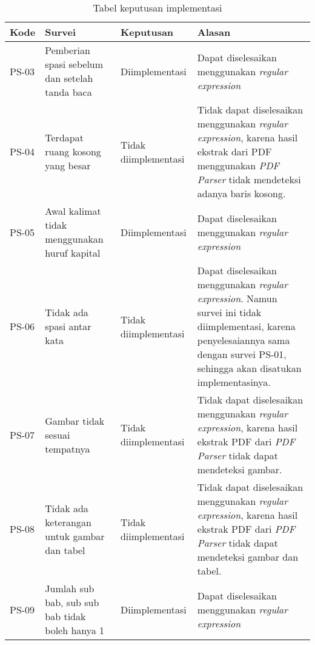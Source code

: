 \begin{table}[H]
	\renewcommand{\arraystretch}{1.5}
	\caption {Tabel keputusan implementasi} \label{tab:keputusan2}
	\begin{center}
		\begin{tabular}{|p{1.5 cm}|>{\raggedright} p{4 cm}| p{2.5 cm}| p{6.5 cm}|}
		\hline
		Kode & Survei & Keputusan & Alasan \\ 
		\hline 
		PS-03 & Pemberian spasi sebelum dan setelah tanda baca & Diimplementasi & Dapat diselesaikan menggunakan \textit{regular expression} \newline \\ 
		\hline 
		PS-04 & Terdapat ruang kosong yang besar & Tidak \newline diimplementasi & Tidak dapat diselesaikan menggunakan \textit{regular expression}, karena hasil ekstrak dari PDF menggunakan \textit{PDF Parser} tidak mendeteksi adanya baris kosong. \newline \\ 		
		\hline 
		PS-05 & Awal kalimat tidak menggunakan huruf kapital & Diimplementasi & Dapat diselesaikan menggunakan \textit{regular expression} \newline \\ 
		\hline
		PS-06 & Tidak ada spasi antar kata & Tidak \newline diimplementasi & Dapat diselesaikan menggunakan \textit{regular expression}. Namun survei ini tidak
diimplementasi, karena penyelesaiannya sama dengan survei PS-01, sehingga akan disatukan implementasinya. \newline \\ 
		\hline 
		PS-07 & Gambar tidak sesuai tempatnya & Tidak \newline diimplementasi & Tidak dapat diselesaikan menggunakan \textit{regular expression}, karena hasil ekstrak PDF dari \textit{PDF Parser} tidak dapat mendeteksi gambar. \newline \\ 
		\hline 
		PS-08 & Tidak ada keterangan untuk gambar dan tabel & Tidak \newline diimplementasi & Tidak dapat diselesaikan menggunakan \textit{regular expression}, karena hasil ekstrak PDF dari \textit{PDF Parser} tidak dapat mendeteksi gambar dan tabel. \newline \\ 
		\hline 
		PS-09 & Jumlah sub bab, sub sub bab tidak boleh hanya 1 & Diimplementasi & Dapat diselesaikan menggunakan \textit{regular expression} \newline \\ 

\end{tabular}
\end{center}
\end{table}
